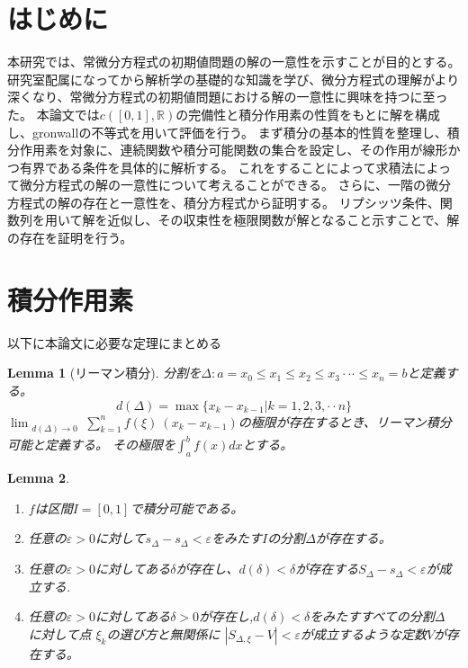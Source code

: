 \documentclass[a4paper]{article}
\newtheorem{Lemma}{Lemma}       %
\begin{document}
\maketitle
\tableofcontents
\section{はじめに}
本研究では、常微分方程式の初期値問題の解の一意性を示すことが目的とする。
研究室配属になってから解析学の基礎的な知識を学び、微分方程式の理解がより深くなり、常微分方程式の初期値問題における解の一意性に興味を持つに至った。
本論文では$c([0,1],\mathbb{R})$の完備性と積分作用素の性質をもとに解を構成し、gronwallの不等式を用いて評価を行う。
まず積分の基本的性質を整理し、積分作用素を対象に、連続関数や積分可能関数の集合を設定し、その作用が線形かつ有界である条件を具体的に解析する。
これをすることによって求積法によって微分方程式の解の一意性について考えることができる。
さらに、一階の微分方程式の解の存在と一意性を、積分方程式から証明する。
リプシッツ条件、関数列を用いて解を近似し、その収束性を極限関数が解となること示すことで、解の存在を証明を行う。

\section{積分作用素}
\label{sec:積分作用素}
以下に本論文に必要な定理にまとめる

\begin{Lemma}[リーマン積分]
    分割を$\Delta:a=x_{0}\leq x_{1}\leq x_{2}\leq x_{3} \cdot \cdot \cdot \leq x_{n}=b$と定義する。
    \[d(\Delta)=\max\{x_{k}-x_{k-1}|k=1,2,3,\cdot \cdot n \}\]
    $\displaystyle \lim_{\substack{d(\Delta) \to 0}} \sum_{k=1}^{n} f(\xi)
    \ (x_k-x_{k-1})$の極限が存在するとき、リーマン積分可能と定義する。
    その極限を$\displaystyle \int_{a}^{b} f(x) dx$とする。
\end{Lemma}

\begin{Lemma}
    \begin{enumerate}
        \item $f$は区間$I=[0,1]$で積分可能である。\\
        \item 任意の$\varepsilon>0$に対して$s_{\Delta}-s_{\Delta}<\varepsilon$をみたす$I$の分割$\Delta$が存在する。\\
        \item 任意の$\varepsilon>0$に対してある$\delta$が存在し、$d(\delta)<\delta$が存在する$ S_{\Delta}-s_{\Delta}<\varepsilon$が成立する.\\
        \item 任意の$\varepsilon>0$に対してある$\delta>0$が存在し,$d(\delta)<\delta$をみたすすべての分割$\Delta$ に対して点 $\xi_{k}$の選び方と無関係に
        $|S_{\Delta,\xi}-V|<\varepsilon$が成立するような定数$V$が存在する。
    \end{enumerate}
\end{Lemma}
\end{document}
